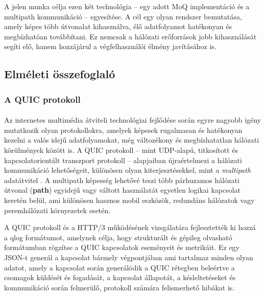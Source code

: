 \documentclass[a4paper,oneside]{article}
\begin{document}
A jelen munka célja ezen két technológia – egy adott MoQ implementáció és a multipath kommunikáció 
– egyesítése. A cél egy olyan rendszer bemutatása, 
amely képes több útvonalat kihasználva, élő adatfolyamot hatékonyan és megbízhatóan 
továbbítani. Ez nemcsak a hálózati erőforrások jobb kihasználását segíti elő, hanem 
hozzájárul a végfelhasználói élmény javításához is.



\subsection{Elméleti összefoglaló}

\subsubsection{A QUIC protokoll}
\paragraph{}
Az internetes multimédia átviteli technológiai fejlődése során egyre 
nagyobb igény mutatkozik olyan protokollokra, amelyek képesek 
rugalmasan és hatékonyan kezelni a valós idejű adatfolyamokat, még 
változékony és megbízhatatlan hálózati körülmények között is. \cite{quic} A QUIC 
protokoll – mint UDP-alapú, titkosított és kapcsolatorientált 
transzport protokoll – alapjaiban újraértelmezi a hálózati kommunikáció 
lehetőségeit, különösen olyan kiterjesztésekkel, mint a \emph{multipath} 
adatátvitel \cite{mp_quic}. A multipath képesség lehetővé teszi több párhuzamos hálózati 
útvonal (\textbf{path}) egyidejű vagy váltott használatát egyetlen logikai kapcsolat keretén 
belül, ami különösen hasznos mobil eszközök, redundáns hálózatok vagy peremhálózati környezetek esetén.

A QUIC protokoll és a HTTP/3 működésének vizsgálatára fejlesztették ki hozzá a qlog \cite{qlog} formátumot, amelynek célja,
hogy strukturált és gépileg olvasható formátumban rögzítse a QUIC kapcsolatok eseményeit és metrikáit.
Ez egy JSON-t generál a kapcsolat bármely végpontjában ami tartalmaz minden olyan adatot, amely a 
kapcsolat során generálódik a QUIC rétegben beleértve a csomagok küldését és fogadását,
a kapcsolat állapotát, a késleltetéseket és kommunikáció során felmerülő, protokoll számára felismerhető hibákat is.
\end{document}
